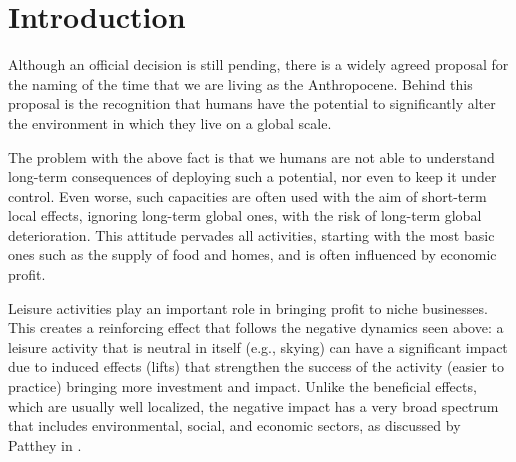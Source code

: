 \documentclass[sustainability,article,submit,pdftex,moreauthors]{Definitions/mdpi}
\begin{document}



\tableofcontents





\section{Introduction}

Although an official decision is still pending, there is a widely agreed proposal for the naming of the time that we are living as the Anthropocene.  Behind this proposal is the recognition that humans have the potential to significantly alter the environment in which they live on a global scale.

The problem with the above fact is that we humans are not able to understand long-term consequences of deploying such a potential, nor even to keep it under control. Even worse, such capacities are often used with the aim of short-term local effects, ignoring long-term global ones, with the risk of long-term global deterioration. This attitude pervades all activities, starting with the most basic ones such as the supply of food and homes, and is often influenced by economic profit.

Leisure activities play an important role in bringing profit to niche businesses. This creates a reinforcing effect that follows the negative dynamics seen above: a leisure activity that is neutral in itself (e.g., skying) can have a significant impact due to induced effects (lifts) that strengthen the success of the activity (easier to practice) bringing more investment and impact. Unlike the beneficial effects, which are usually well localized, the negative impact has a very broad spectrum that includes environmental, social, and economic sectors, as discussed by Patthey in \cite{pat08a}.
\end{document}
